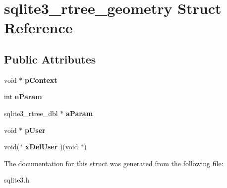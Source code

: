 \hypertarget{structsqlite3__rtree__geometry}{}\section{sqlite3\+\_\+rtree\+\_\+geometry Struct Reference}
\label{structsqlite3__rtree__geometry}
\subsection*{Public Attributes}
\begin{DoxyCompactItemize}
\item 
\mbox{\label{structsqlite3__rtree__geometry_a62fe439a49ed5b8628464c418f35f572}} 
void $\ast$ {\bfseries p\+Context}
\item 
\mbox{\label{structsqlite3__rtree__geometry_ada7b9eba82660e3321dd4c93526697c9}} 
int {\bfseries n\+Param}
\item 
\mbox{\label{structsqlite3__rtree__geometry_a0a22e4b810cb1b8f1af792fd50493002}} 
sqlite3\+\_\+rtree\+\_\+dbl $\ast$ {\bfseries a\+Param}
\item 
\mbox{\label{structsqlite3__rtree__geometry_add62e1cd5faa6000c815104af3c540d0}} 
void $\ast$ {\bfseries p\+User}
\item 
\mbox{\label{structsqlite3__rtree__geometry_ae9835a39924a75b33cce9f6b10e1813f}} 
void($\ast$ {\bfseries x\+Del\+User} )(void $\ast$)
\end{DoxyCompactItemize}


The documentation for this struct was generated from the following file\+:\begin{DoxyCompactItemize}
\item 
sqlite3.\+h\end{DoxyCompactItemize}

